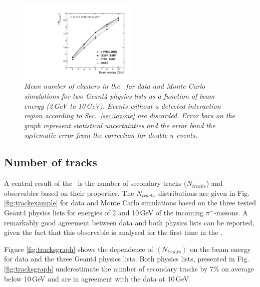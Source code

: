 \begin{figure}
	\centering
	\includegraphics[width=0.5\textwidth]{ECAL/plots/cluster-graph.pdf}
	\caption{\label{fig:clustergraph} \sl Mean number of clusters in the \ecal\ for data and  Monte Carlo simulations for two {\sc Geant}4 physics lists as a function of beam energy (2\,GeV to 10\,GeV). Events without a detected interaction region according to Sec.~\ref{sec:iazone} are discarded. Error bars on the graph represent statistical uncertainties and the error band the systematic error from the correction for double $\pi$ events.}
\end{figure}

\subsection{Number of tracks}
A central result of the \tfa\ is the number of secondary tracks ($N_{tracks}$) and observables based on their properties.
The $N_{tracks}$ distributions are given in Fig. \ref{fig:trackexample} for data and Monte Carlo simulations based on the three tested {\sc Geant4} physics lists for energies of 2 and 10\,GeV of the incoming $\pi^-$-mesons. A remarkably good agreement between data and both physics lists can be reported, given the fact that this observable is analysed for the first time in the \ecal. 

Figure \ref{fig:tracksgraph} shows the dependence of $\left<N_{tracks}\right>$ on the beam energy for data and the three {\sc Geant4} physics lists. 
Both physics lists, presented in Fig.  \ref{fig:tracksgraph} underestimate the number of secondary tracks by 7\% on average below 10\,GeV and are in agreement with the data at 10\,GeV. 

